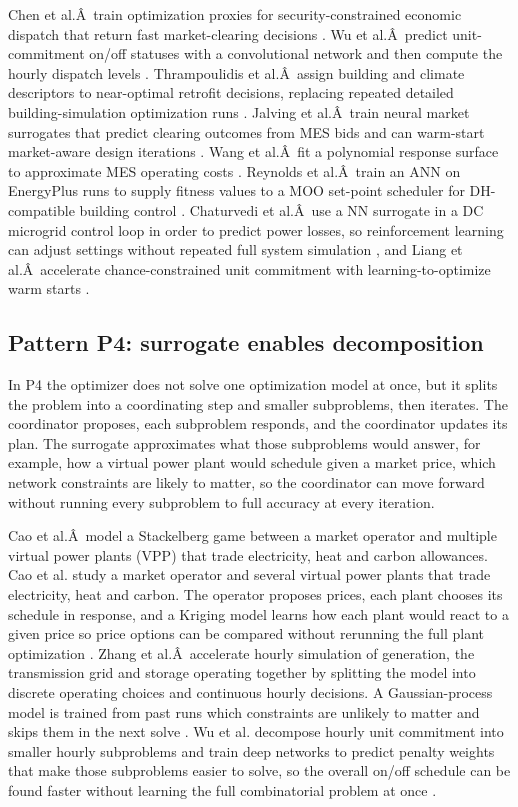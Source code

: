 \documentclass[final,5p,times,twocolumn]{elsarticle}
\begin{document}
Chen et al.Â~train optimization proxies for security-constrained economic
dispatch that return fast market-clearing decisions
\cite{Chen2022,Chen20244723}. Wu et al.Â~predict unit-commitment on/off
statuses with a convolutional network and then compute the hourly
dispatch levels \cite{Wu2022231}. Thrampoulidis et al.Â~assign building and
climate descriptors to near-optimal retrofit decisions, replacing
repeated detailed building-simulation optimization runs
\cite{Thrampoulidis2021}. Jalving et al.Â~train neural market surrogates that
predict clearing outcomes from MES bids and can warm-start market-aware
design iterations \cite{Jalving2023}. Wang et al.Â~fit a polynomial response
surface to approximate MES operating costs \cite{Wang2020202933}. Reynolds
et al.Â~train an ANN on EnergyPlus runs to supply fitness values to a MOO
set-point scheduler for DH-compatible building control
\cite{Reynolds2017704}. Chaturvedi et al.Â~use a NN surrogate in a DC
microgrid control loop in order to predict power losses, so
reinforcement learning can adjust settings without repeated full system
simulation \cite{Chaturvedi2024149}, and Liang et al.Â~accelerate
chance-constrained unit commitment with learning-to-optimize warm starts
\cite{Liang20246508}.

\subsection{Pattern P4: surrogate enables decomposition}
\label{sec:int:decomp}

In P4 the optimizer does not solve one optimization model at once, but
it splits the problem into a coordinating step and smaller subproblems,
then iterates. The coordinator proposes, each subproblem responds, and
the coordinator updates its plan. The surrogate approximates what those
subproblems would answer, for example, how a virtual power plant would
schedule given a market price, which network constraints are likely to
matter, so the coordinator can move forward without running every
subproblem to full accuracy at every iteration.

Cao et al.Â~model a Stackelberg game between a market operator and
multiple virtual power plants (VPP) that trade electricity, heat and
carbon allowances. Cao et al. study a market operator and several
virtual power plants that trade electricity, heat and carbon. The
operator proposes prices, each plant chooses its schedule in response,
and a Kriging model learns how each plant would react to a given price
so price options can be compared without rerunning the full plant
optimization \cite{Cao2023__2}. Zhang et al.Â~accelerate hourly simulation
of generation, the transmission grid and storage operating together by
splitting the model into discrete operating choices and continuous
hourly decisions. A Gaussian-process model is trained from past runs
which constraints are unlikely to matter and skips them in the next
solve \cite{Zhang2025__4}. Wu et al. decompose hourly unit commitment into
smaller hourly subproblems and train deep networks to predict penalty
weights that make those subproblems easier to solve, so the overall
on/off schedule can be found faster without learning the full
combinatorial problem at once \cite{Wu2024391}.
\end{document}
